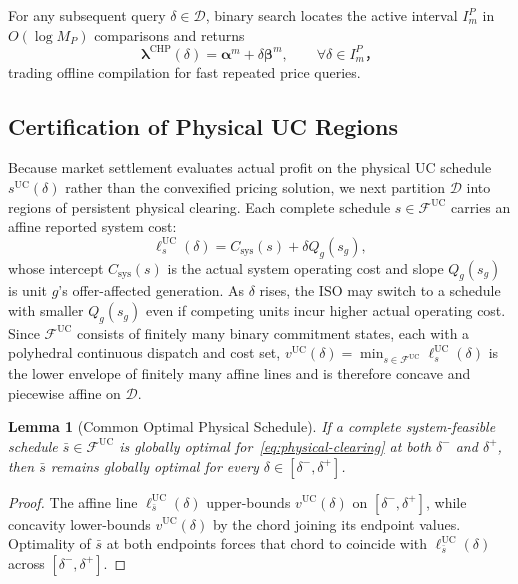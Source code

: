\documentclass[journal]{IEEEtran}
\newtheorem{lemma}{Lemma}
\newcommand{\blambda}{\bm\lambda}
\newcommand{\UC}{\mathrm{UC}}
\newcommand{\CHP}{\mathrm{CHP}}
\begin{document}
For any subsequent query $\delta\in\mathcal{D}$, binary search locates the active interval $I_m^P$ in $O(\log M_P)$ comparisons and returns
\begin{equation}
\blambda^{\CHP}(\delta) = \bm{\alpha}^m + \delta\bm{\beta}^m, \qquad \forall\delta\in I_m^P，\label{eq:affine-price}
\end{equation}
trading offline compilation for fast repeated price queries.

\subsection{Certification of Physical UC Regions}
Because market settlement evaluates actual profit on the physical UC schedule $s^{\UC}(\delta)$ rather than the convexified pricing solution, we next partition $\mathcal{D}$ into regions of persistent physical clearing. Each complete schedule $s\in\mathcal{F}^{\UC}$ carries an affine reported system cost:
\begin{equation}
\ell_s^{\UC}(\delta) = C_{\mathrm{sys}}(s) + \delta Q_g(s_g),\label{eq:uc-line}
\end{equation}
whose intercept $C_{\mathrm{sys}}(s)$ is the actual system operating cost and slope $Q_g(s_g)$ is unit $g$'s offer-affected generation. As $\delta$ rises, the ISO may switch to a schedule with smaller $Q_g(s_g)$ even if competing units incur higher actual operating cost. Since $\mathcal{F}^{\UC}$ consists of finitely many binary commitment states, each with a polyhedral continuous dispatch and cost set, $v^{\UC}(\delta)\!\!=\!\!\min_{s\!\in\mathcal{F}^{\UC}}\ell_s^{\UC}(\delta)$ is the lower envelope of finitely many affine lines and is therefore concave and piecewise affine on $\mathcal{D}$.

\begin{lemma}[Common Optimal Physical Schedule]
\label{lem:uc}
If a complete system-feasible schedule $\bar{s}\in\mathcal{F}^{\UC}$ is globally optimal for~\eqref{eq:physical-clearing} at both $\delta^-$ and $\delta^+$, then $\bar{s}$ remains globally optimal for every $\delta\in[\delta^-,\delta^+]$.
\end{lemma}

\begin{proof}
The affine line $\ell_{\bar{s}}^{\UC}(\delta)$ upper-bounds $v^{\UC}(\delta)$ on $[\delta^-,\delta^+]$, while concavity lower-bounds $v^{\UC}(\delta)$ by the chord joining its endpoint values. Optimality of $\bar{s}$ at both endpoints forces that chord to coincide with $\ell_{\bar{s}}^{\UC}(\delta)$ across $[\delta^-,\delta^+]$.
\end{proof}
\end{document}

